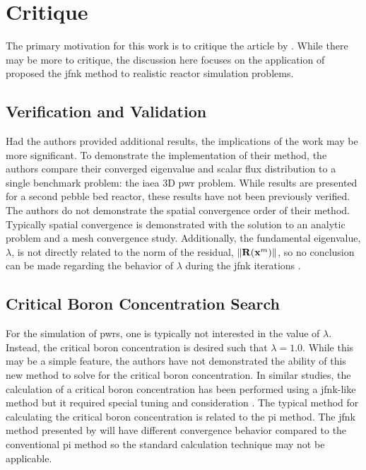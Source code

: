 \section{Critique}
\label{sec:critique}

  The primary motivation for this work is to critique the article by
  \citeauthor{qe2paper}. While there may be more to critique, the discussion
  here focuses on the application of proposed the \gls{jfnk} method to realistic
  reactor simulation problems.

  \subsection{Verification and Validation}

    Had the authors provided additional results, the implications of the work
    may be more significant. To demonstrate the implementation of their method,
    the authors compare their converged eigenvalue and scalar flux distribution
    to a single benchmark problem: the \gls{iaea} 3D \gls{pwr} problem. While
    results are presented for a second pebble bed reactor, these results have
    not been previously verified. The authors do not demonstrate the spatial
    convergence order of their method. Typically spatial convergence is
    demonstrated with the solution to an analytic problem and a mesh convergence
    study. Additionally, the fundamental eigenvalue, $\lambda$, is not directly
    related to the norm of the residual, $\| \mathbf{R} (\mathbf{x}^m) \|$, so no
    conclusion can be made regarding the behavior of $\lambda$ during the
    \gls{jfnk} iterations \cite{caslJFNK}.

  \subsection{Critical Boron Concentration Search}

    For the simulation of \glspl{pwr}, one is typically not interested in the
    value of $\lambda$. Instead, the critical boron concentration is desired
    such that $\lambda=1.0$. While this may be a simple feature, the authors
    have not demonstrated the ability of this new method to solve for the
    critical boron concentration. In similar studies, the calculation of a
    critical boron concentration has been performed using a \gls{jfnk}-like
    method but it required special tuning and consideration \cite{caslJFNK}. The
    typical method for calculating the critical boron concentration is related
    to the \gls{pi} method. The \gls{jfnk} method presented by
    \citeauthor{qe2paper} will have different convergence behavior compared to
    the conventional \gls{pi} method so the standard calculation technique may
    not be applicable.


